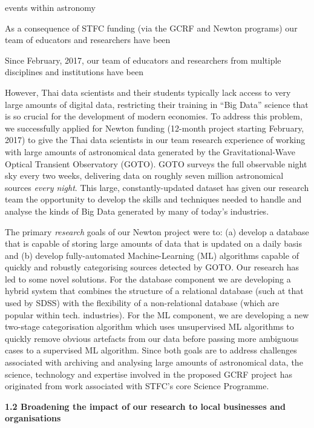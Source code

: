 \documentclass[11pt]{article}
\begin{document}
  events within astronomy  
  
  As a consequence of STFC funding (via the GCRF and Newton programs) our team of educators and researchers have been 
  
  Since February, 2017, our team of educators and researchers from multiple disciplines and institutions have been 
  
  
  However, Thai data scientists and their students typically lack access to very large amounts of digital data, restricting their training in ``Big Data'' science that is so crucial for the development of modern economies. To address this problem, we successfully applied for Newton funding (12-month project starting February, 2017) to give the Thai data scientists in our team research experience of working with large amounts of astronomical data generated by the Gravitational-Wave Optical Transient Observatory (GOTO). GOTO surveys the full observable night sky every two weeks, delivering data on roughly seven million astronomical sources {\it every night}. This large, constantly-updated dataset has given our research team the opportunity to develop the skills and techniques needed to handle and analyse the kinds of Big Data generated by many of today's industries.
  
  \vspace{2mm}
  \noindent
  The primary {\it research} goals of our Newton project were to: (a) develop a database that is capable of storing large amounts of data that is updated on a daily basis and (b) develop fully-automated Machine-Learning (ML) algorithms capable of quickly and robustly categorising sources detected by GOTO. Our research has led to some novel solutions. For the database component we are developing a hybrid system that combines the structure of a relational database (such at that used by SDSS) with the flexibility of a non-relational database (which are popular within tech. industries). For the ML component, we are developing a new two-stage categorisation algorithm which uses unsupervised ML algorithms to quickly remove obvious artefacts from our data before passing more ambiguous cases to a supervised ML algorithm. Since both goals are to address challenges associated with archiving and analysing large amounts of astronomical data, the science, technology and expertise involved in the proposed GCRF project has originated from work associated with STFC's core Science Programme. 
  
  \vspace{3mm}
  \noindent
  {\large \bf 1.2 Broadening the impact of our research to local businesses and organisations}
  
\end{document}
